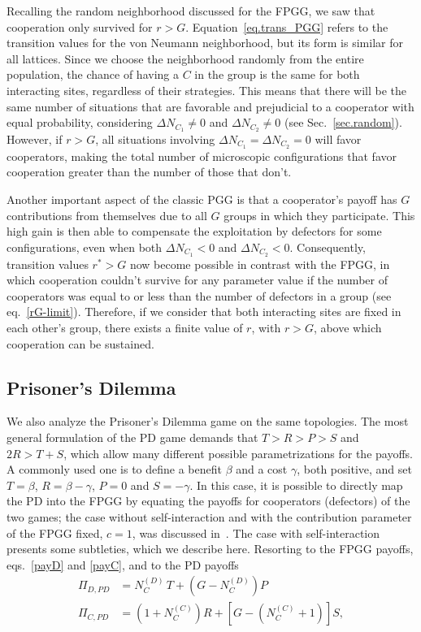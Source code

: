 \documentclass[5p,review]{elsarticle}
\begin{document}
Recalling the random neighborhood discussed for the FPGG, we saw that cooperation only survived for $r > G$.
%
Equation~\ref{eq.trans_PGG} refers to the transition values for the von Neumann neighborhood, but its form is similar for all lattices. 
%
Since we choose the neighborhood randomly from the entire population, the chance of having a $C$ in the group is the same for both interacting sites, regardless of their strategies. 
%
This means that there will be the same number of situations that are favorable and prejudicial to a cooperator with equal probability, considering $\Delta N_{C_1} \neq 0$  and $\Delta N_{C_2}  \neq 0 $ (see Sec.~\ref{sec.random}).
%
However, if $r>G$, all situations involving $\Delta N_{C_1} = \Delta N_{C_2}  = 0 $ will favor  cooperators, making the total number of microscopic configurations that favor cooperation greater than the number of those that don't.  
%


Another important aspect of the classic PGG is that a cooperator's payoff has $G$ contributions from themselves due to all $G$ groups in which they participate. 
%
This high gain is then able to compensate the exploitation by defectors for some configurations, even  when both $\Delta N_{C_1} < 0$  and $\Delta N_{C_2}  < 0 $. 
%
Consequently, transition values $r^* > G$ now become possible in contrast with the FPGG, in which cooperation couldn't survive for any parameter value if the number of cooperators was equal to or less than the number of defectors in a group (see eq.~\ref{rG-limit}).
%
Therefore, if we consider that both interacting sites are fixed in each other's group, there exists a finite value of $r$, with $r>G$,  above which cooperation can be sustained.


\subsection{Prisoner's Dilemma}
\label{pd_sec}

We also analyze the Prisoner's Dilemma game on the same topologies.
%
The most general formulation of the PD game demands that $T>R>P>S$ and $2R>T+S$, which allow many different possible parametrizations for the payoffs. 
%
A commonly used one is to define a benefit $\beta$  and a cost $\gamma$, both positive, and set $T = \beta$, $R = \beta - \gamma$, $P = 0$ and $S = - \gamma$. In this case, it is possible to directly map the PD into the FPGG by equating the payoffs for cooperators (defectors) of the two games; the case without self-interaction and with the contribution parameter of the FPGG fixed, $ c=1$, was discussed in~\cite{Hauert2003}.  The case with self-interaction presents some subtleties, which we describe here. Resorting to the FPGG payoffs, eqs.~\ref{payD} and \ref{payC}, and to the PD payoffs
\begin{align}
    \Pi_{D,PD} &= N^{{\scriptscriptstyle(D)}}_C \,T + (G-N^{{\scriptscriptstyle(D)}}_C)P\\
    \Pi_{C,PD} &= (1+N^{{\scriptscriptstyle(C)}}_C) R + \left[G-(N^{{\scriptscriptstyle(C)}}_C+1)\right] S,
\end{align}
\end{document}
